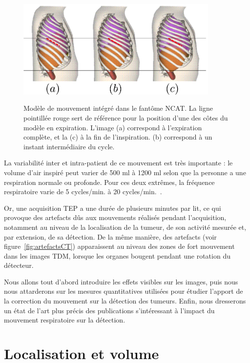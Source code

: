 \begin{figure}[h!]
    \begin{center}
            \includegraphics[width=10cm]{images/mvtRespi} \\
    \end{center}
    \caption[Modèle de mouvement intégré dans le fantôme NCAT]{Modèle de mouvement intégré dans le fantôme NCAT. La ligne pointillée rouge sert de référence pour la position d'une des côtes du modèle en expiration. L'image (a) correspond à l'expiration complète, et la (c) à la fin de l'inspiration. (b) correspond à un instant intermédiaire du cycle. }
    \label{fig:respiXCAT}
\end{figure}


La variabilité inter et intra-patient de ce mouvement est très importante : le volume d'air inspiré peut varier de 500 ml à 1200 ml selon que la personne a une respiration normale ou profonde. Pour ces deux extrêmes, la fréquence respiratoire varie de 5 cycles/min. à 20 cycles/min.~\cite{sherwood2006fundamentals}.

Or, une acquisition TEP a une durée de plusieurs minutes par lit, ce qui provoque des artefacts dûs aux mouvements réalisés pendant l'acquisition, notamment au niveau de la localisation de la tumeur, de son activité mesurée et, par extension, de sa détection. De la même manière, des artefacts (voir figure~\ref{fig:artefactsCT}) apparaissent au niveau des zones de fort mouvement dans les images TDM, lorsque les organes bougent pendant une rotation du détecteur.

Nous allons tout d'abord introduire les effets visibles sur les images, puis nous nous attarderons sur les mesures quantitatives utilisées pour étudier l'apport de la correction du mouvement sur la détection des tumeurs. Enfin, nous dresserons un état de l'art plus précis des publications s'intéressant à l'impact du mouvement respiratoire sur la détection.

\section{Localisation et volume}


